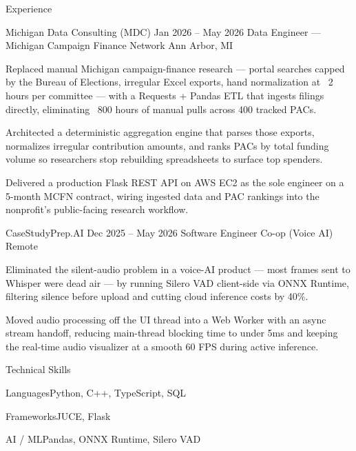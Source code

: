 \documentclass[
	11pt
]{../../../template}
\begin{document}
\begin{rSection}{E}{xperience}
		\begin{rSectionEntry}
			{Michigan Data Consulting (MDC)}
			{Jan 2026 -- May 2026}
			{Data Engineer --- Michigan Campaign Finance Network}
			{}
			{Ann Arbor, MI}

			\item Replaced manual Michigan campaign-finance research --- portal searches capped by the Bureau of Elections, irregular Excel exports, hand normalization at ~2 hours per committee --- with a Requests + Pandas ETL that ingests filings directly, eliminating ~800 hours of manual pulls across 400 tracked PACs.
			\item Architected a deterministic aggregation engine that parses those exports, normalizes irregular contribution amounts, and ranks PACs by total funding volume so researchers stop rebuilding spreadsheets to surface top spenders.
			\item Delivered a production Flask REST API on AWS EC2 as the sole engineer on a 5-month MCFN contract, wiring ingested data and PAC rankings into the nonprofit's public-facing research workflow.
		\end{rSectionEntry}

		\begin{rSectionEntry}
			{CaseStudyPrep.AI}
			{Dec 2025 -- May 2026}
			{Software Engineer Co-op (Voice AI)}
			{}
			{Remote}

			\item Eliminated the silent-audio problem in a voice-AI product --- most frames sent to Whisper were dead air --- by running Silero VAD client-side via ONNX Runtime, filtering silence before upload and cutting cloud inference costs by 40\%.
			\item Moved audio processing off the UI thread into a Web Worker with an async stream handoff, reducing main-thread blocking time to under 5ms and keeping the real-time audio visualizer at a smooth 60 FPS during active inference.
		\end{rSectionEntry}
	\end{rSection}

	\begin{rSection}{T}{echnical Skills}
		\begin{rSet}{Languages}{Python, C++, TypeScript, SQL}
		\end{rSet}
		\begin{rSet}{Frameworks}{JUCE, Flask}
		\end{rSet}
		\begin{rSet}{AI / ML}{Pandas, ONNX Runtime, Silero VAD}
		\end{rSet}
	\end{rSection}
\end{document}
